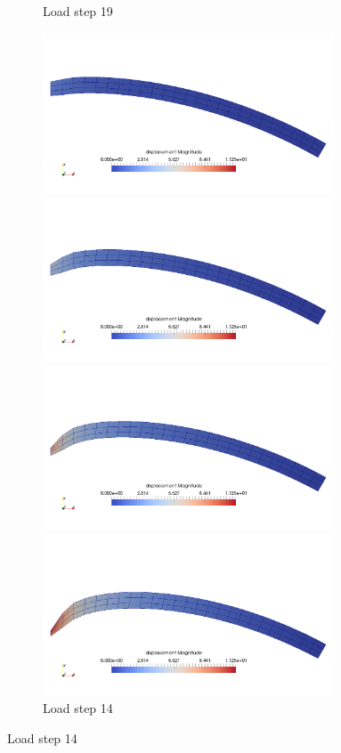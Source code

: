 \documentclass[11pt,a4paper,final]{article}
\begin{document}
\begin{figure}[ht!]
\begin{subfigure}[b]{0.49\textwidth}
\caption{Load step 19}
\label{fig:1.15.1}
\end{subfigure}
\begin{subfigure}[b]{0.49\textwidth}
\centering
\includegraphics[width=0.95\textwidth]{crisfield_ls_4.png}
\caption{Load step 4}
\centering
\includegraphics[width=0.95\textwidth]{crisfield_ls_9.png}
\caption{Load step 9}
\centering
\includegraphics[width=0.95\textwidth]{crisfield_ls_14.png}
\caption{Load step 14}
\centering
\includegraphics[width=0.95\textwidth]{crisfield_ls_19.png}

\end{subfigure}
\end{figure}
\end{document}
